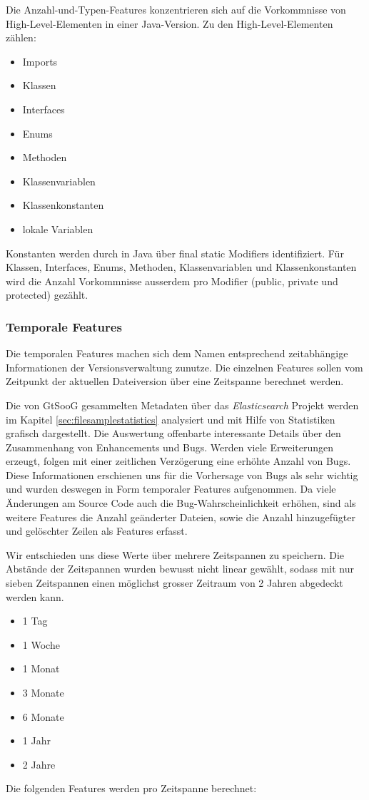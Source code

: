 \documentclass[10pt, a4paper]{article}
\begin{document}
Die Anzahl-und-Typen-Features konzentrieren sich auf die Vorkommnisse von High-Level-Elementen in einer Java-Version. Zu den High-Level-Elementen zählen:

\begin{itemize}
	\item Imports
	\item Klassen
	\item Interfaces
	\item Enums
	\item Methoden
	\item Klassenvariablen
	\item Klassenkonstanten
	\item lokale Variablen
\end{itemize}

Konstanten werden durch in Java über final static Modifiers identifiziert.
Für Klassen, Interfaces, Enums, Methoden, Klassenvariablen und Klassenkonstanten wird die Anzahl Vorkommnisse ausserdem pro Modifier (public, private und protected) gezählt.

\subsubsection{Temporale Features} \label{sec:temporalfeatures}
Die temporalen Features machen sich dem Namen entsprechend zeitabhängige Informationen der Versionsverwaltung zunutze. Die einzelnen Features sollen vom Zeitpunkt der aktuellen Dateiversion über eine Zeitspanne berechnet werden.

Die von GtSooG gesammelten Metadaten über das \emph{Elasticsearch} Projekt werden im Kapitel \ref{sec:filesamplestatistics} analysiert und mit Hilfe von Statistiken grafisch dargestellt. Die Auswertung offenbarte interessante Details über den Zusammenhang von Enhancements und Bugs. Werden viele Erweiterungen erzeugt, folgen mit einer zeitlichen Verzögerung eine erhöhte Anzahl von Bugs. Diese Informationen erschienen uns für die Vorhersage von Bugs als sehr wichtig und wurden deswegen in Form temporaler Features aufgenommen. Da viele Änderungen am Source Code auch die Bug-Wahrscheinlichkeit erhöhen, sind als weitere Features die Anzahl geänderter Dateien, sowie die Anzahl hinzugefügter und gelöschter Zeilen als Features erfasst.

Wir entschieden uns diese Werte über mehrere Zeitspannen zu speichern. Die Abstände der Zeitspannen wurden bewusst nicht linear gewählt, sodass mit nur sieben Zeitspannen einen möglichst grosser Zeitraum von 2 Jahren abgedeckt werden kann.
\begin{itemize}
	\item 1 Tag
	\item 1 Woche
	\item 1 Monat
	\item 3 Monate
	\item 6 Monate
	\item 1 Jahr
	\item 2 Jahre
\end{itemize}
Die folgenden Features werden pro Zeitspanne berechnet:
\end{document}
